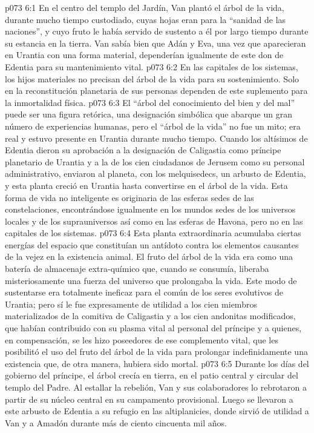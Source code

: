 \vs p073 6:1 En el centro del templo del Jardín, Van plantó el árbol de la vida, durante mucho tiempo custodiado, cuyas hojas eran para la “sanidad de las naciones”, y cuyo fruto le había servido de sustento a él por largo tiempo durante su estancia en la tierra. Van sabía bien que Adán y Eva, una vez que aparecieran en Urantia con una forma material, dependerían igualmente de este don de Edentia para su mantenimiento vital.
\vs p073 6:2 En las capitales de los sistemas, los hijos materiales no precisan del árbol de la vida para su sostenimiento. Solo en la reconstitución planetaria de sus personas dependen de este suplemento para la inmortalidad física.
\vs p073 6:3 \pc El “árbol del conocimiento del bien y del mal” puede ser una figura retórica, una designación simbólica que abarque un gran número de experiencias humanas, pero el “árbol de la vida” no fue un mito; era real y estuvo presente en Urantia durante mucho tiempo. Cuando los altísimos de Edentia dieron su aprobación a la designación de Caligastia como príncipe planetario de Urantia y a la de los cien ciudadanos de Jerusem como su personal administrativo, enviaron al planeta, con los melquisedecs, un arbusto de Edentia, y esta planta creció en Urantia hasta convertirse en el árbol de la vida. Esta forma de vida no inteligente es originaria de las esferas sedes de las constelaciones, encontrándose igualmente en los mundos sedes de los universos locales y de los suprauniversos así como en las esferas de Havona, pero no en las capitales de los sistemas.
\vs p073 6:4 Esta planta extraordinaria acumulaba ciertas energías del espacio que constituían un antídoto contra los elementos causantes de la vejez en la existencia animal. El fruto del árbol de la vida era como una batería de almacenaje extra\hyp{}químico que, cuando se consumía, liberaba misteriosamente una fuerza del universo que prolongaba la vida. Este modo de sustentarse era totalmente ineficaz para el común de los seres evolutivos de Urantia; pero sí le fue expresamente de utilidad a los cien miembros materializados de la comitiva de Caligastia y a los cien andonitas modificados, que habían contribuido con su plasma vital al personal del príncipe y a quienes, en compensación, se les hizo poseedores de ese complemento vital, que les posibilitó el uso del fruto del árbol de la vida para prolongar indefinidamente una existencia que, de otra manera, hubiera sido mortal.
\vs p073 6:5 \pc Durante los días del gobierno del príncipe, el árbol crecía en tierra, en el patio central y circular del templo del Padre. Al estallar la rebelión, Van y sus colaboradores lo rebrotaron a partir de su núcleo central en su campamento provisional. Luego se llevaron a este arbusto de Edentia a su refugio en las altiplanicies, donde sirvió de utilidad a Van y a Amadón durante más de ciento cincuenta mil años.
